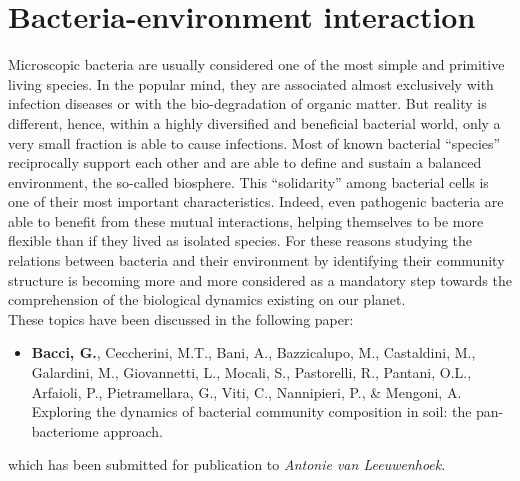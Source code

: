 \logvartrue
\chapter{Bacteria-environment interaction}
Microscopic bacteria are usually considered one of the most simple and primitive living species. In the popular mind, they are associated almost exclusively with infection diseases or with the bio-degradation of organic matter. But reality is different, hence, within a highly diversified and beneficial bacterial world, only a very small fraction is able to cause infections. Most of known bacterial ``species'' reciprocally support each other and are able to define and sustain a balanced environment, the so-called biosphere. This ``solidarity'' among bacterial cells is one of their  most important characteristics. Indeed, even pathogenic bacteria are able to benefit from these mutual interactions, helping themselves to be more flexible than if they lived as isolated species. For these reasons studying the relations between bacteria and their environment by identifying their community structure is becoming more and more considered as a mandatory step towards the comprehension of the biological dynamics existing on our planet.\\
These topics have been discussed in the following paper:
\vspace{-5mm}
\begin{itemize}[nosep]
\item \textbf{Bacci, G.}, Ceccherini, M.T., Bani, A., Bazzicalupo, M., Castaldini, M., Galardini, M., Giovannetti, L., Mocali, S., Pastorelli, R., Pantani, O.L., Arfaioli, P., Pietramellara, G., Viti, C., Nannipieri, P., \& Mengoni, A. Exploring the dynamics of bacterial community composition in soil: the pan-bacteriome approach.
\end{itemize}
which has been submitted for publication to \textit{Antonie van Leeuwenhoek}.

